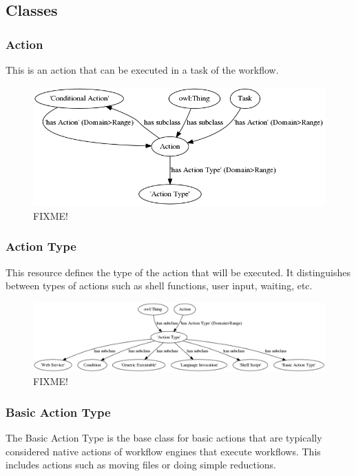 \subsection{Classes}
			
\subsubsection{Action}
This is an action that can be executed in a task of the workflow.
			
\begin{figure}[htbp]
\centering
\includegraphics[width=\textwidth]{figures/action.png}
\caption{FIXME!}
\label{action}
\end{figure}

\subsubsection{Action Type}
This resource defines the type of the action that will be executed. It
distinguishes between types of actions such as shell functions, user input,
waiting, etc.
			
\begin{figure}[htbp]
\centering
\includegraphics[width=\textwidth]{figures/actionType.png}
\caption{FIXME!}
\label{actionType}
\end{figure}
			
			\subsubsection{
			Basic Action Type
			}
			The Basic Action Type is the base class for basic actions that are typically considered native actions of workflow engines that execute workflows. This includes actions such as moving files or doing simple reductions.
